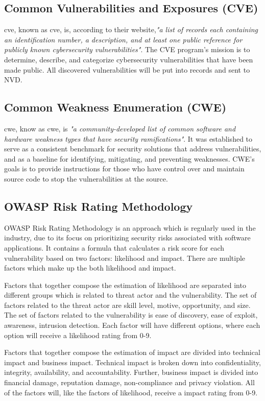 \subsection{Common Vulnerabilities and Exposures (CVE)}
\acrlong{cve}, known as \acrshort{cve}, is, according to their website,\textit{"a list of records each containing an identification number, a description, and at least one public reference for publicly known cybersecurity vulnerabilities"}\cite{CVE}. The CVE program's mission is to determine, describe, and categorize cybersecurity vulnerabilities that have been made public. All discovered vulnerabilities will be put into records and sent to NVD.\cite{CVE}

\subsection{Common Weakness Enumeration (CWE)}
\acrlong{cwe}, know as \acrshort{cwe}, is \textit{"a community-developed list of common software and hardware weakness types that have security ramifications"}\cite{CWE}. It was established to serve as a consistent benchmark for security solutions that address vulnerabilities, and as a baseline for identifying, mitigating, and preventing weaknesses. CWE's goals is to provide instructions for those who have control over and maintain source code to stop the vulnerabilities at the source. 

\subsection{OWASP Risk Rating Methodology}
OWASP Risk Rating Methodology is an approach which is regularly used in the industry, due to its focus on prioritizing security risks associated with software applications. It contains a formula  that calculates a risk score for each vulnerability based on two factors: likelihood and impact. There are multiple factors which make up the both likelihood and impact. 

Factors that together compose the estimation of likelihood are separated into different groups which is related to threat actor and the vulnerability. The set of factors related to the threat actor are skill level, motive, opportunity, and size. The set of factors related to the vulnerability is ease of discovery, ease of exploit, awareness, intrusion detection. Each factor will have different options, where each option will receive a likelihood rating from 0-9. 

Factors that together compose the estimation of impact are divided into technical impact and business impact. Technical impact is broken down into confidentiality, integrity, availability, and accountability. Further, business impact is divided into financial damage, reputation damage, non-compliance and privacy violation. All of the factors will, like the factors of likelihood, receive a impact rating from 0-9. 

